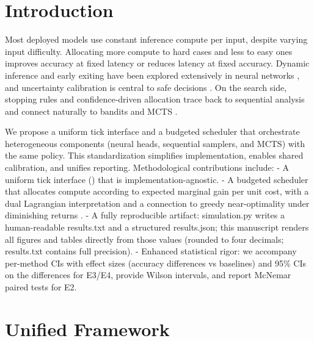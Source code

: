 \section{Introduction}
Most deployed models use constant inference compute per input, despite varying input difficulty. Allocating more compute to hard cases and less to easy ones improves accuracy at fixed latency or reduces latency at fixed accuracy. Dynamic inference and early exiting have been explored extensively in neural networks \cite{Graves2016ACT,Teerapittayanon2016BranchyNet,Huang2018MSDNet,Wang2018SkipNet,Kaya2019ShallowDeep,Xin2020DeeBERT,Liu2020FastBERT,Elbayad2020DepthAdaptive,NiculescuMizil2005Calib,Figurnov2017SACT,Bolukbasi2017Adaptive,Cai2020OFA,Xiao2021DynamicViT,Geifman2019SelectiveNet}, and uncertainty calibration is central to safe decisions \cite{Guo2017Calibration,Kendall2017Uncertainty,Gal2016DropoutBayes,Platt1999}. On the search side, stopping rules and confidence-driven allocation trace back to sequential analysis \cite{Wald1945Sequential} and connect naturally to bandits and MCTS \cite{Kocsis2006UCT,Coulom2006MCTS,Silver2017AlphaZero,Schrittwieser2020MuZero,LattimoreSzepesvari2020,Kalyanakrishnan2012PAC,Anthony2017ThinkingFast}. 

We propose a uniform tick interface and a budgeted scheduler that orchestrate heterogeneous components (neural heads, sequential samplers, and MCTS) with the same policy. This standardization simplifies implementation, enables shared calibration, and unifies reporting. Methodological contributions include:
- A uniform tick interface (\TickAPI) that is implementation-agnostic.
- A budgeted scheduler that allocates compute according to expected marginal gain per unit cost, with a dual Lagrangian interpretation and a connection to greedy near-optimality under diminishing returns \cite{BoydVandenberghe2004,Nemhauser1978}.
- A fully reproducible artifact: simulation.py writes a human-readable results.txt and a structured results.json; this manuscript renders all figures and tables directly from those values (rounded to four decimals; results.txt contains full precision).
- Enhanced statistical rigor: we accompany per-method CIs with effect sizes (accuracy differences vs baselines) and 95\% CIs on the differences for E3/E4, provide Wilson intervals, and report McNemar paired tests for E2.

\section{Unified Framework}
\label{sec:framework}
